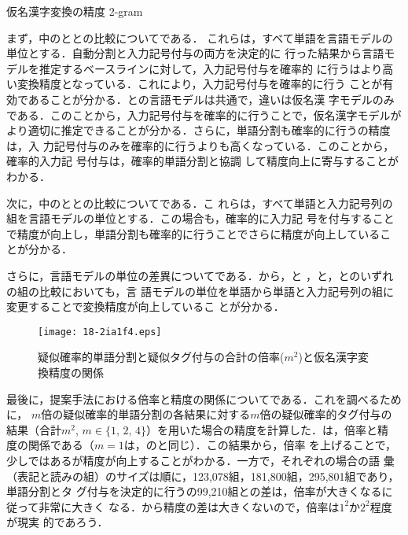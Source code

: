 \documentclass[japanese]{jnlp_JS2.0}
\def\tabref#1{}
\def\figref#1{}
\def\KKC#1{}
\begin{document}
\begin{table}[t]
\caption{仮名漢字変換の精度 2-gram}

\label{table:result}
\end{table}

まず，\tabref{table:result}中の\KKC{DDw}と\KKC{DSw}と\KKC{SSw}の比較についてである．
これらは，すべて単語を言語モデルの単位とする．自動分割と入力記号付与の両方を決定的に
行った結果から言語モデルを推定するベースライン\KKC{DDw}に対して，入力記号付与を確率的
に行う\KKC{DSw}はより高い変換精度となっている．これにより，入力記号付与を確率的に行う
ことが有効であることが分かる．\KKC{DDw}と\KKC{DSw}の言語モデルは共通で，違いは仮名漢
字モデルのみである．このことから，入力記号付与を確率的に行うことで，仮名漢字モデルが
より適切に推定できることが分かる．さらに，単語分割も確率的に行う\KKC{SSw}の精度は，入
力記号付与のみを確率的に行う\KKC{DSw}よりも高くなっている．このことから，確率的入力記
号付与は，確率的単語分割\cite{擬似確率的単語分割コーパスによる言語モデルの改良}と協調
して精度向上に寄与することがわかる．

次に，\tabref{table:result}中の\KKC{DDu}と\KKC{DSu}と\KKC{SSu}の比較についてである．こ
れらは，すべて単語と入力記号列の組を言語モデルの単位とする．この場合も，確率的に入力記
号を付与することで精度が向上し，単語分割も確率的に行うことでさらに精度が向上しているこ
とが分かる．

さらに，言語モデルの単位の差異についてである．\tabref{table:result}から，\KKC{DDw}と
\KKC{DDu}，\KKC{DSw}と\KKC{DSu}，\KKC{SSw}と\KKC{SSu}のいずれの組の比較においても，言
語モデルの単位を単語から単語と入力記号列の組に変更することで変換精度が向上しているこ
とが分かる．

\begin{figure}[tb]
\begin{center}
\texttt{[image: 18-2ia1f4.eps]}
\end{center}
  \caption{疑似確率的単語分割と疑似タグ付与の合計の倍率($m^{2}$)と仮名漢字変換精度の関係}
  \label{figure:graph}
\end{figure}

最後に，提案手法\KKC{SSu}における倍率と精度の関係についてである．これを調べるために，
$m$倍の疑似確率的単語分割の各結果に対する$m$倍の疑似確率的タグ付与の結果（合計$m^2$,
$m \in \{1,\,2,\,4\}$）を用いた場合の精度を計算した．\figref{figure:graph}は，倍率と精
度の関係である（$m = 1$は，\tabref{table:result}の\KKC{SSu}と同じ）．この結果から，倍率
を上げることで，少しではあるが精度が向上することがわかる．一方で，それぞれの場合の語
彙（表記と読みの組）のサイズは順に，123,078組，181,800組，295,801組であり，単語分割とタ
グ付与を決定的に行う\KKC{DDu}の99,210組との差は，倍率が大きくなるに従って非常に大きく
なる．\figref{figure:graph}から精度の差は大きくないので，倍率は$1^2$か$2^2$程度が現実
的であろう．
\end{document}
